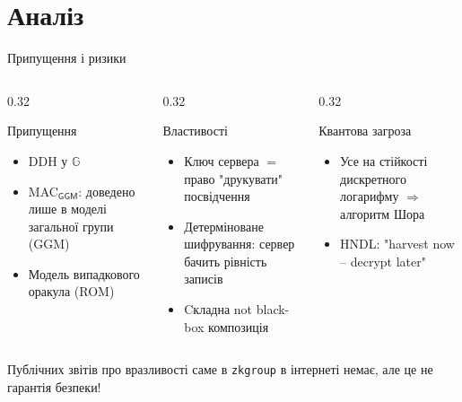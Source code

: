 \documentclass[aspectratio=169, 10pt, xcolor=svgnames]{beamer}
\newcommand{\G}{\mathbb{G}}
\begin{document}
\section{Аналіз}
\begin{frame}{Припущення і ризики}
  \begin{columns}[T]
    \begin{column}{0.32\textwidth}
      \begin{block}{Припущення\footnotemark[1]}
        \small
        \begin{itemize}
          \item DDH у $\G$
          \item MAC$_\mathsf{GGM}$: доведено лише в моделі загальної групи (GGM)
          \item Модель випадкового оракула (ROM)
        \end{itemize}
      \end{block}
    \end{column}
    \begin{column}{0.32\textwidth}
      \begin{block}{Властивості}
        \small
        \begin{itemize}
          \item Ключ сервера $=$ право "друкувати"{} посвідчення
          \item Детерміноване шифрування: сервер бачить рівність записів
          \item Cкладна not black-box композиція
        \end{itemize}
      \end{block}
    \end{column}
    \begin{column}{0.32\textwidth}
      \begin{alertblock}{Квантова загроза}
        \small
        \begin{itemize}
          \item Усе на стійкості дискретного логарифму $\Rightarrow$ алгоритм Шора
          \item HNDL: "harvest now -- decrypt later"{}
        \end{itemize}
      \end{alertblock}
    \end{column}
  \end{columns}
  \vfill
  \centering\small Публічних звітів про вразливості саме в \texttt{zkgroup} в інтернеті немає, але це не гарантія 
  безпеки!
\end{frame}
\end{document}
